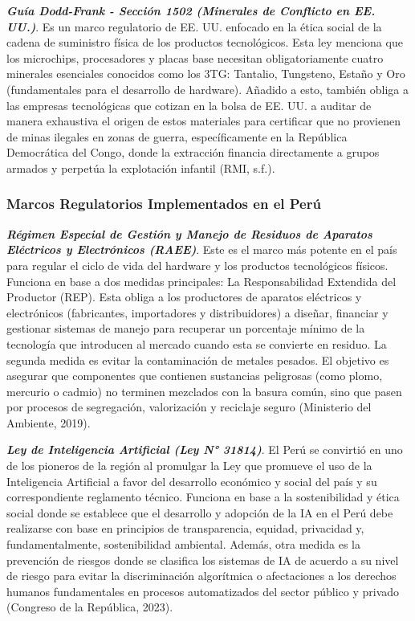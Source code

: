 \documentclass[stu,12pt,a4paper]{apa7}
\begin{document}
\textbf{\textit{Guía Dodd-Frank - Sección 1502 (Minerales de Conflicto en EE. UU.)}}. Es un marco regulatorio de EE. UU. enfocado en la ética social de la cadena de suministro física de los productos tecnológicos. Esta ley menciona que los microchips, procesadores y placas base necesitan obligatoriamente cuatro minerales esenciales conocidos como los 3TG: Tantalio, Tungsteno, Estaño y Oro (fundamentales para el desarrollo de hardware). Añadido a esto, también obliga a las empresas tecnológicas que cotizan en la bolsa de EE. UU. a auditar de manera exhaustiva el origen de estos materiales para certificar que no provienen de minas ilegales en zonas de guerra, específicamente en la República Democrática del Congo, donde la extracción financia directamente a grupos armados y perpetúa la explotación infantil (RMI, s.f.).

    \subsubsection{Marcos Regulatorios Implementados en el Perú}
\textbf{\textit{Régimen Especial de Gestión y Manejo de Residuos de Aparatos Eléctricos y Electrónicos (RAEE)}}. Este es el marco más potente en el país para regular el ciclo de vida del hardware y los productos tecnológicos físicos. Funciona en base a dos medidas principales: La Responsabilidad Extendida del Productor (REP). Esta obliga a los productores de aparatos eléctricos y electrónicos (fabricantes, importadores y distribuidores) a diseñar, financiar y gestionar sistemas de manejo para recuperar un porcentaje mínimo de la tecnología que introducen al mercado cuando esta se convierte en residuo. La segunda medida es evitar la contaminación de metales pesados. El objetivo es asegurar que componentes que contienen sustancias peligrosas (como plomo, mercurio o cadmio) no terminen mezclados con la basura común, sino que pasen por procesos de segregación, valorización y reciclaje seguro (Ministerio del Ambiente, 2019).

\textbf{\textit{Ley de Inteligencia Artificial (Ley N° 31814)}}. El Perú se convirtió en uno de los pioneros de la región al promulgar la Ley que promueve el uso de la Inteligencia Artificial a favor del desarrollo económico y social del país y su correspondiente reglamento técnico. Funciona en base a la sostenibilidad y ética social donde se establece que el desarrollo y adopción de la IA en el Perú debe realizarse con base en principios de transparencia, equidad, privacidad y, fundamentalmente, sostenibilidad ambiental. Además, otra medida es la prevención de riesgos donde se clasifica los sistemas de IA de acuerdo a su nivel de riesgo para evitar la discriminación algorítmica o afectaciones a los derechos humanos fundamentales en procesos automatizados del sector público y privado (Congreso de la República, 2023).
\end{document}
